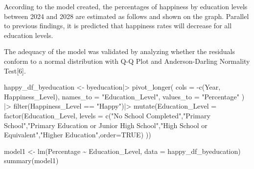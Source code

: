 \documentclass[
  11pt,
  a4paper,
  DIV=11,
  numbers=noendperiod]{scrartcl}
\newenvironment{Shaded}{\begin{snugshade}}{\end{snugshade}}
\newcommand{\AttributeTok}[1]{\textcolor[rgb]{0.40,0.45,0.13}{#1}}
\newcommand{\ConstantTok}[1]{\textcolor[rgb]{0.56,0.35,0.01}{#1}}
\newcommand{\FunctionTok}[1]{\textcolor[rgb]{0.28,0.35,0.67}{#1}}
\newcommand{\NormalTok}[1]{\textcolor[rgb]{0.00,0.23,0.31}{#1}}
\newcommand{\OtherTok}[1]{\textcolor[rgb]{0.00,0.23,0.31}{#1}}
\newcommand{\SpecialCharTok}[1]{\textcolor[rgb]{0.37,0.37,0.37}{#1}}
\newcommand{\StringTok}[1]{\textcolor[rgb]{0.13,0.47,0.30}{#1}}
\begin{document}
According to the model created, the percentages of happiness by
education levels between 2024 and 2028 are estimated as follows and
shown on the graph. Parallel to previous findings, it is predicted that
happiness rates will decrease for all education levels.

The adequacy of the model was validated by analyzing whether the
residuals conform to a normal distribution with Q-Q Plot and
Anderson-Darling Normality Test{[}6{]}.

\begin{Shaded}
\begin{Highlighting}[]
\NormalTok{happy\_df\_byeducation  }\OtherTok{\textless{}{-}}\NormalTok{ byeducation}\SpecialCharTok{|\textgreater{}}
  \FunctionTok{pivot\_longer}\NormalTok{(}
    \AttributeTok{cols =} \SpecialCharTok{{-}}\FunctionTok{c}\NormalTok{(Year, Happiness\_Level),}
    \AttributeTok{names\_to =} \StringTok{"Education\_Level"}\NormalTok{,}
    \AttributeTok{values\_to =} \StringTok{"Percentage"}
\NormalTok{  ) }\SpecialCharTok{|\textgreater{}}
  \FunctionTok{filter}\NormalTok{(Happiness\_Level }\SpecialCharTok{==} \StringTok{"Happy"}\NormalTok{)}\SpecialCharTok{|\textgreater{}}
\FunctionTok{mutate}\NormalTok{(}\AttributeTok{Education\_Level =} \FunctionTok{factor}\NormalTok{(Education\_Level, }
                                  \AttributeTok{levels =} \FunctionTok{c}\NormalTok{(}\StringTok{"No School Completed"}\NormalTok{,}\StringTok{"Primary School"}\NormalTok{,}\StringTok{"Primary Education or Junior High School"}\NormalTok{,}\StringTok{"High School or Equivalent"}\NormalTok{,}\StringTok{"Higher Education"}\NormalTok{,}\AttributeTok{order=}\ConstantTok{TRUE}\NormalTok{)}
\NormalTok{))}

\NormalTok{model1 }\OtherTok{\textless{}{-}} \FunctionTok{lm}\NormalTok{(Percentage }\SpecialCharTok{\textasciitilde{}}\NormalTok{ Education\_Level, }\AttributeTok{data =}\NormalTok{ happy\_df\_byeducation)}
\FunctionTok{summary}\NormalTok{(model1)}
\end{Highlighting}
\end{Shaded}
\end{document}

